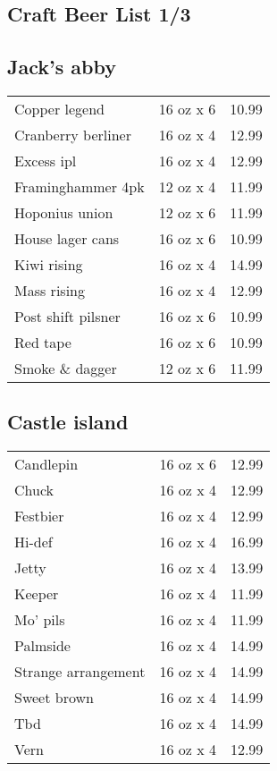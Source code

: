 \documentclass{article}%
\begin{document}
%
\pagestyle{empty}%
\normalsize%
%
\setlength{\columnseprule}{0.5pt}%
\setlength{\columnsep}{1cm}%
\renewcommand{\familydefault}{\sfdefault}%
\sffamily%
%
%
\begin{multicols}{3}%
\section*{\selectfont Craft Beer List 1/3}%

%
\subsection*{Jack's abby}%
\begin{tabular}{>{\raggedright}p{16ex\hangindent=3ex} c r}%
Copper legend&16 oz x 6&10.99\\%
Cranberry berliner&16 oz x 4&12.99\\%
Excess ipl&16 oz x 4&12.99\\%
Framinghammer 4pk&12 oz x 4&11.99\\%
Hoponius union&12 oz x 6&11.99\\%
House lager cans&16 oz x 6&10.99\\%
Kiwi rising&16 oz x 4&14.99\\%
Mass rising&16 oz x 4&12.99\\%
Post shift pilsner&16 oz x 6&10.99\\%
Red tape&16 oz x 6&10.99\\%
Smoke \& dagger&12 oz x 6&11.99\\%
\end{tabular}

%
\subsection*{Castle island}%
\begin{tabular}{>{\raggedright}p{16ex\hangindent=3ex} c r}%
Candlepin&16 oz x 6&12.99\\%
Chuck&16 oz x 4&12.99\\%
Festbier&16 oz x 4&12.99\\%
Hi{-}def&16 oz x 4&16.99\\%
Jetty&16 oz x 4&13.99\\%
Keeper&16 oz x 4&11.99\\%
Mo' pils&16 oz x 4&11.99\\%
Palmside&16 oz x 4&14.99\\%
Strange arrangement&16 oz x 4&14.99\\%
Sweet brown&16 oz x 4&14.99\\%
Tbd&16 oz x 4&14.99\\%
Vern&16 oz x 4&12.99\\%
\end{tabular}


\end{multicols}
\end{document}
